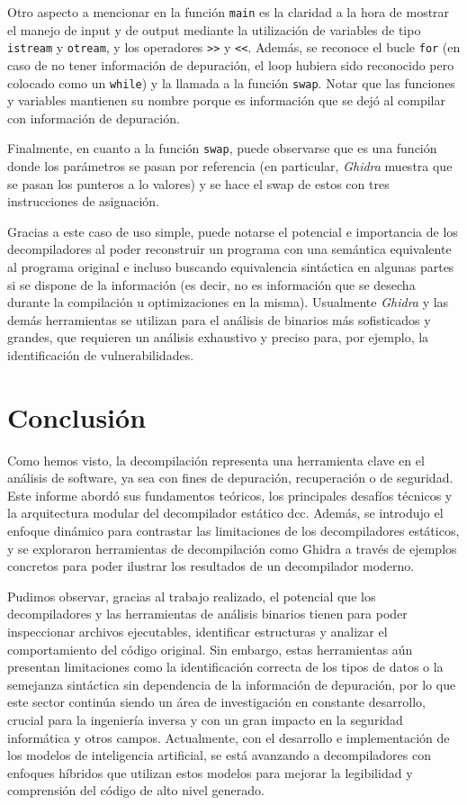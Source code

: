 \documentclass[runningheads]{llncs}
\begin{document}
Otro aspecto a mencionar en la función \verb|main| es la claridad a la hora de mostrar el manejo 
de input y de output mediante la utilización de variables de tipo \verb|istream| y \verb|otream|, y
los operadores \verb|>>| y \verb|<<|. Además, se reconoce el bucle \verb|for| (en caso de no tener 
información de depuración, el loop hubiera sido reconocido pero colocado como un \verb|while|) y la 
llamada a la función \verb|swap|. Notar que las funciones y variables mantienen su nombre porque es 
información que se dejó al compilar con información de depuración.

Finalmente, en cuanto a la función \verb|swap|, puede observarse que es una función donde los parámetros 
se pasan por referencia (en particular, \textit{Ghidra} muestra que se pasan los punteros a lo valores)
y se hace el swap de estos con tres instrucciones de asignación.

Gracias a este caso de uso simple, puede notarse el potencial e importancia de los decompiladores 
al poder reconstruir un programa con una semántica equivalente al programa original e incluso buscando 
equivalencia sintáctica en algunas partes si se dispone de la información (es decir, no es información 
que se desecha durante la compilación u optimizaciones en la misma). Usualmente \textit{Ghidra}
y las demás herramientas se utilizan para el análisis de binarios más sofisticados y grandes, que 
requieren un análisis exhaustivo y preciso para, por ejemplo, la identificación de vulnerabilidades.

\section{Conclusión}
Como hemos visto, la decompilación representa una herramienta clave en el análisis de software,
ya sea con fines de depuración, recuperación o de seguridad. Este informe abordó sus fundamentos teóricos,
los principales desafíos técnicos y la arquitectura modular del decompilador estático dcc. 
Además, se introdujo el enfoque dinámico para contrastar las limitaciones de los decompiladores 
estáticos, y se exploraron herramientas de decompilación como Ghidra a través de ejemplos concretos 
para poder ilustrar los resultados de un decompilador moderno. 

Pudimos observar, gracias al trabajo realizado, el potencial que los decompiladores y las herramientas 
de análisis binarios tienen para poder inspeccionar archivos ejecutables, identificar estructuras 
y analizar el comportamiento del código original. Sin embargo, estas herramientas aún presentan 
limitaciones como la identificación correcta de los tipos de datos o la semejanza sintáctica sin 
dependencia de la información de depuración, por lo que este sector continúa siendo un área de 
investigación en constante desarrollo, crucial para la ingeniería inversa y con un gran impacto 
en la seguridad informática y otros campos. Actualmente, con el desarrollo e implementación de 
los modelos de inteligencia artificial, se está avanzando a decompiladores con enfoques híbridos 
que utilizan estos modelos para mejorar la legibilidad y comprensión del código de alto nivel generado.



\end{document}

